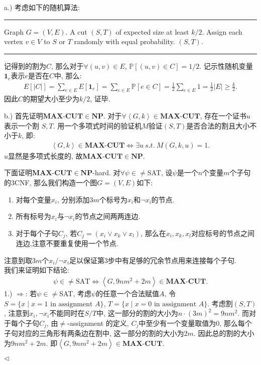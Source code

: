 \documentclass[11pt]{article}
\makeatletter
\newenvironment{breakablealgorithm}
  {%
    \begin{center}
      \refstepcounter{algorithm}%
      \hrule height.8pt depth0pt \kern2pt%
      \parskip 0pt
      \renewcommand{\caption}[2][\relax]{%
        {\raggedright\textbf{\fname@algorithm~\thealgorithm} ##2\par}%
        \ifx\relax##1\relax %
          \addcontentsline{loa}{algorithm}{\protect\numberline{\thealgorithm}##2}%
        \else %
          \addcontentsline{loa}{algorithm}{\protect\numberline{\thealgorithm}##1}%
        \fi
        \kern2pt\hrule\kern2pt
     }
  }
  {%
     \kern2pt\hrule\relax%
   \end{center}
  }
\newcommand{\NP}{\mathbf{NP}}
\newcommand{\PP}{\mathbb{P}}
\newcommand{\1}{\mathbf{1}}
\newenvironment{answer}[1][Answer]{\begin{trivlist}
\item[\hskip \labelsep{\bfseries\itshape#1.}\hskip \labelsep]}{\hfill$\lhd$\end{trivlist}}
\makeatother
\begin{document}
\begin{answer}
    a.) 考虑如下的随机算法:
    \begin{breakablealgorithm}
        \centering
        \begin{algorithmic}[1]
            \Require Graph $G = (V, E)$.
            \Ensure A cut $(S, T)$ of expected size at least $k/2$.
            \State Assign each vertex $v \in V$ to $S$ or $T$ randomly with equal probability.
            \State \Return $(S, T)$.
        \end{algorithmic}
    \end{breakablealgorithm}
    记得到的割为$C$, 那么对于$\forall (u,v) \in E $, $\PP[(u,v)\in C] = 1/2$. 记示性随机变量$\1_e$表示$e$是否在$C$中, 那么:
    \begin{align*}
        E[|C|] = \sum_{e \in E} E[\1_e] = \sum_{e \in E} \PP[e \in C] = \frac{1}{2} \sum_{e \in E} 1 = \frac{1}{2} |E| \ge \frac{k}{2}.
    \end{align*}
    因此$C$的期望大小至少为$k/2$, 证毕.

    b.) 首先证明$\textbf{MAX-CUT} \in \NP$. 对于$\forall \left\langle G, k \right\rangle \in \textbf{MAX-CUT}$, 存在一个证书$u$表示一个割 $S, T$. 用一个多项式时间的验证机$M$验证$(S,T)$是否合法的割且大小不小于$k$, 即:
    \begin{align*}
        \left\langle G, k \right\rangle \in \textbf{MAX-CUT} \iff \exists u ~s.t.~ M(G, k, u) = 1.
    \end{align*}
    $u$显然是多项式长度的, 故$\textbf{MAX-CUT} \in \NP$.

    下面证明$\textbf{MAX-CUT} \in \NP$-hard. 对$\forall \psi \in \neq$SAT, 设$\psi$是一个$n$个变量$m$个子句的3CNF, 那么我们构造一个图$G = (V, E)$如下:
    \begin{enumerate}
        \item 对每个变量$x_i$, 分别添加$3m$个标号为$x_i$和$\neg x_i$的节点.
        \item 所有标号为$x_i$与$\neg x_i$的节点之间两两连边. 
        \item 对于每个子句$C_j$, 若$C_j = (x_i \lor x_k \lor x_l)$, 那么在$x_i, x_k, x_l$对应标号的节点之间连边,注意不要重复使用一个节点. 
    \end{enumerate}
    注意到取$3m$个$x_i/\neg x_i$足以保证第3步中有足够的冗余节点用来连接每个子句. 
    \\我们来证明如下结论:
    \begin{align*}
        \psi \in \neq \text{SAT} \iff \left\langle G, 9nm^2+2m \right\rangle \in \textbf{MAX-CUT}.
    \end{align*}
    1.) $\Rightarrow$: 若$\psi \in \neq$SAT, 考虑$\psi$的任意一个合法赋值$A$, 令$S = \{x \mid x = 1 \text{ in assignment } A\}$, $T = \{x \mid x = 0 \text{ in assignment } A\}$. 考虑割$(S,T)$, 注意到$x_i, \neg x_i$不能同时在$S/T$中, 这一部分的割的大小为$n\cdot (3m)^2 = 9nm^2$. 而对于每个子句$C_j$, 由$\neq$-assignment 的定义, $C_j$中至少有一个变量取值为0, 那么每个子句对应的三角形有两条边在割中, 这一部分的割的大小为$2m$. 因此总的割的大小为$9nm^2+2m$. 即$\left\langle G, 9nm^2+2m \right\rangle \in \textbf{MAX-CUT}$.


\end{answer}
\end{document}
